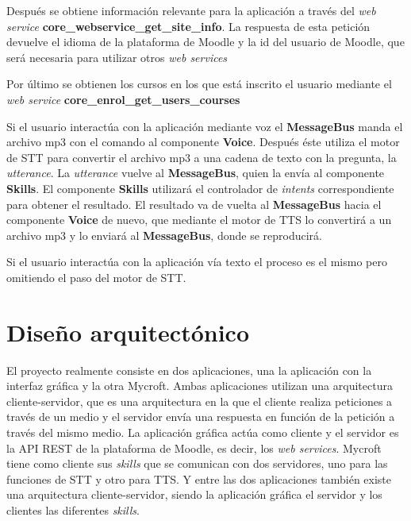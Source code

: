 Después se obtiene información relevante para la aplicación a través del \textit{web service} \textbf{core\_webservice\_get\_site\_info}. La respuesta de esta petición devuelve el idioma de la plataforma de Moodle y la id del usuario de Moodle, que será necesaria para utilizar otros \textit{web services}

Por último se obtienen los cursos en los que está inscrito el usuario mediante el \textit{web service} \textbf{core\_enrol\_get\_users\_courses}

Si el usuario interactúa con la aplicación mediante voz el \textbf{MessageBus} manda el archivo mp3 con el comando al componente \textbf{Voice}. Después éste utiliza el motor de STT para convertir el archivo mp3 a una cadena de texto con la pregunta, la \textit{utterance}.
La \textit{utterance} vuelve al \textbf{MessageBus}, quien la envía al componente \textbf{Skills}. El componente \textbf{Skills} utilizará el controlador de \textit{intents} correspondiente para obtener el resultado.
El resultado va de vuelta al \textbf{MessageBus} hacia el componente \textbf{Voice} de nuevo, que mediante el motor de TTS lo convertirá a un archivo mp3 y lo enviará al \textbf{MessageBus}, donde se reproducirá.

Si el usuario interactúa con la aplicación vía texto el proceso es el mismo pero omitiendo el paso del motor de STT.


\section{Diseño arquitectónico}

El proyecto realmente consiste en dos aplicaciones, una la aplicación con la interfaz gráfica y la otra Mycroft. Ambas aplicaciones utilizan una arquitectura cliente-servidor, que es una arquitectura en la que el cliente realiza peticiones a través de un medio y el servidor envía una respuesta en función de la petición a través del mismo medio. La aplicación gráfica actúa como cliente y el servidor es la API REST de la plataforma de Moodle, es decir, los \textit{web services}. Mycroft tiene como cliente sus \textit{skills} que se comunican con dos servidores, uno para las funciones de STT y otro para TTS. Y entre las dos aplicaciones también existe una arquitectura cliente-servidor, siendo la aplicación gráfica el servidor y los clientes las diferentes \textit{skills}.
